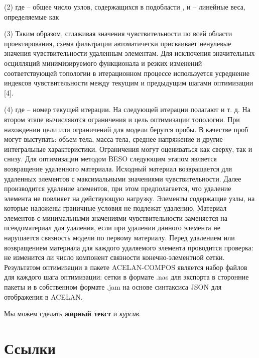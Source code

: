 (2)
где  – общее число узлов, содержащихся в подобласти  , и  – линейные веса, определяемые как

(3)
Таким образом, сглаживая значения чувствительности по всей области проектирования, схема фильтрации автоматически присваивает ненулевые значения чувствительности удаленным элементам. Для исключения значительных осцилляций минимизируемого функционала и резких изменений соответствующей топологии в итерационном процессе используется усреднение индексов чувствительности между текущим и предыдущим шагами оптимизации [4].

(4)
где  – номер текущей итерации. На следующей итерации полагают   и т. д. 
На втором этапе вычисляются ограничения и цель оптимизации топологии. При нахождении цели или ограничений для модели берутся пробы. В качестве проб могут выступать: объем тела, масса тела, среднее напряжение и другие интегральные характеристики. Ограничения могут оцениваться как сверху, так и снизу. 
Для оптимизации методом BESO следующим этапом является возвращение удаленного материала. Исходный материал возвращается для   удаленных элементов с максимальными значениями чувствительности.
Далее производится удаление элементов, при этом предполагается, что удаление элемента не повлияет на действующую нагрузку. Элементы содержащие узлы, на которые наложены граничные условия не подлежат удалению. Материал   элементов с минимальными значениями чувствительности заменяется на псевдоматериал для удаления, если при удалении данного элемента не нарушается связность модели по первому материалу.
Перед удалением или возвращением материала для каждого удаляемого элемента проводится проверка: не изменится ли число компонент связности конечно-элементной сетки. 
Результатом оптимизации в пакете ACELAN-COMPOS является набор файлов для каждого шага оптимизации: сетки в формате .nas для экспорта в сторонние пакеты и в собственном формате .jam на основе синтаксиса JSON для отображения в ACELAN. 




Мы можем сделать \textbf{жирный текст} и \textit{курсив}.

\section{Ссылки}\label{sec:ch1/sec2}

